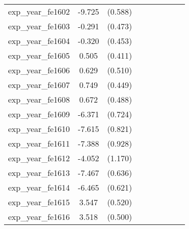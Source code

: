 {\begin{tabular}{l*{4}{cc}}
exp\_year\_fe1602&   -9.725\sym{***}&  (0.588)&                  &         &                  &         &                  &         \\
exp\_year\_fe1603&   -0.291         &  (0.473)&                  &         &                  &         &                  &         \\
exp\_year\_fe1604&   -0.320         &  (0.453)&                  &         &                  &         &                  &         \\
exp\_year\_fe1605&    0.505         &  (0.411)&                  &         &                  &         &                  &         \\
exp\_year\_fe1606&    0.629         &  (0.510)&                  &         &                  &         &                  &         \\
exp\_year\_fe1607&    0.749         &  (0.449)&                  &         &                  &         &                  &         \\
exp\_year\_fe1608&    0.672         &  (0.488)&                  &         &                  &         &                  &         \\
exp\_year\_fe1609&   -6.371\sym{***}&  (0.724)&                  &         &                  &         &                  &         \\
exp\_year\_fe1610&   -7.615\sym{***}&  (0.821)&                  &         &                  &         &                  &         \\
exp\_year\_fe1611&   -7.388\sym{***}&  (0.928)&                  &         &                  &         &                  &         \\
exp\_year\_fe1612&   -4.052\sym{***}&  (1.170)&                  &         &                  &         &                  &         \\
exp\_year\_fe1613&   -7.467\sym{***}&  (0.636)&                  &         &                  &         &                  &         \\
exp\_year\_fe1614&   -6.465\sym{***}&  (0.621)&                  &         &                  &         &                  &         \\
exp\_year\_fe1615&    3.547\sym{***}&  (0.520)&                  &         &                  &         &                  &         \\
exp\_year\_fe1616&    3.518\sym{***}&  (0.500)&                  &         &                  &         &                  &         \\

\end{tabular}}

